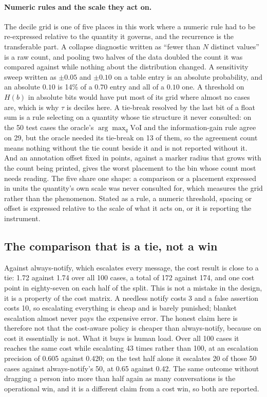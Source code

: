 \documentclass{article}
\begin{document}
\paragraph{Numeric rules and the scale they act on.} The decile grid is one of five
places in this work where a numeric rule had to be re-expressed relative to the
quantity it governs, and the recurrence is the transferable part. A collapse
diagnostic written as ``fewer than $N$ distinct values'' is a raw count, and pooling
two halves of the data doubled the count it was compared against while nothing about
the distribution changed. A sensitivity sweep written as $\pm 0.05$ and $\pm 0.10$
on a table entry is an absolute probability, and an absolute $0.10$ is 14\% of a
$0.70$ entry and all of a $0.10$ one. A threshold on $H(b)$ in absolute bits would
have put most of its grid where almost no cases are, which is why $\tau$ is deciles
here. A tie-break resolved by the last bit of a float sum is a rule selecting on a
quantity whose tie structure it never consulted: on the 50 test cases the oracle's
$\arg\max_q \mathrm{VoI}$ and the information-gain rule agree on 29, but the oracle
needed its tie-break on 13 of them, so the agreement count means nothing without
the tie count beside it and is not reported without it. And an annotation offset
fixed in
points, against a marker radius that grows with the count being printed, gives the
worst placement to the bin whose count most needs reading. The five share one shape:
a comparison or a placement expressed in units the quantity's own scale was never
consulted for, which measures the grid rather than the phenomenon. Stated as a rule,
a numeric threshold, spacing or offset is expressed relative to the scale of what it
acts on, or it is reporting the instrument.

\subsection{The comparison that is a tie, not a win}
\label{sec:tie}
Against always-notify, which escalates every message, the cost result is close to
a tie: 1.72 against 1.74 over all 100 cases, a total of 172 against 174, and one
cost point in eighty-seven on each half of the split. This is not a mistake in the
design, it is a property of
the cost matrix. A needless notify costs 3 and a false assertion costs 10, so
escalating everything is cheap and is barely punished; blanket escalation almost
never pays the expensive error. The honest claim here is therefore not that the
cost-aware policy is cheaper than always-notify, because on cost it essentially is
not. What it buys is human load. Over all 100 cases it reaches the same cost while
escalating 43 times rather than 100, at an escalation precision of 0.605 against
0.420; on the test half alone it escalates 20 of those 50 cases against
always-notify's 50, at 0.65 against 0.42. The
same outcome without dragging a person into more than half again as many
conversations is the operational win, and it is a different claim from a cost win,
so both are reported.
\end{document}
